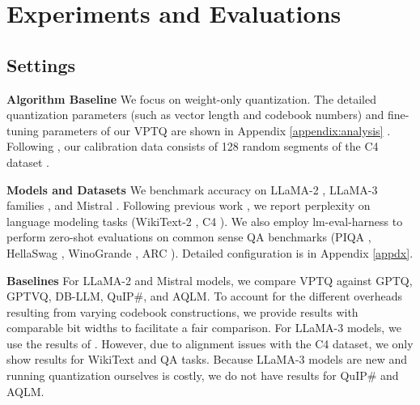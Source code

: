 \section{Experiments and Evaluations}
\vspace{-0.05in}








\subsection{Settings}
\vspace{-0.05in}
 \label{sec:exp_settings}
\quad\textbf{Algorithm Baseline} We focus on weight-only quantization. The detailed quantization parameters (such as vector length and codebook numbers) and fine-tuning parameters of our VPTQ are shown in Appendix \ref{appendix:analysis} . Following \cite{gptq}, our calibration data consists of 128 random segments of the C4 dataset \citep{c4}. 

\textbf{Models and Datasets} We benchmark accuracy on LLaMA-2 \citep{llama2}, LLaMA-3 families \citep{llama3}, and Mistral \cite{mistral7b}. 
Following previous work \citep{gptq}, we report perplexity on language modeling tasks (WikiText-2 \citep{wikitext2}, C4 \citep{c4}).  We also employ lm-eval-harness \citep{lm_eval} to perform zero-shot evaluations on common sense QA benchmarks (PIQA \citep{piqa}, HellaSwag \citep{hellaswag}, WinoGrande \citep{winogrande}, ARC \citep{arc}). Detailed configuration is in Appendix \ref{appdx}.

\textbf{Baselines} For LLaMA-2 and Mistral models, we compare VPTQ against GPTQ, GPTVQ, DB-LLM, QuIP\#, and AQLM.  
To account for the different overheads resulting from varying codebook constructions, we provide results with comparable bit widths to facilitate a fair comparison.
For LLaMA-3 models, we use the results of \cite{llama3quantization}. 
However, due to alignment issues with the C4 dataset, we only show results for WikiText and QA tasks. Because LLaMA-3 models are new and running quantization ourselves is costly, we do not have results for QuIP\# and AQLM.


